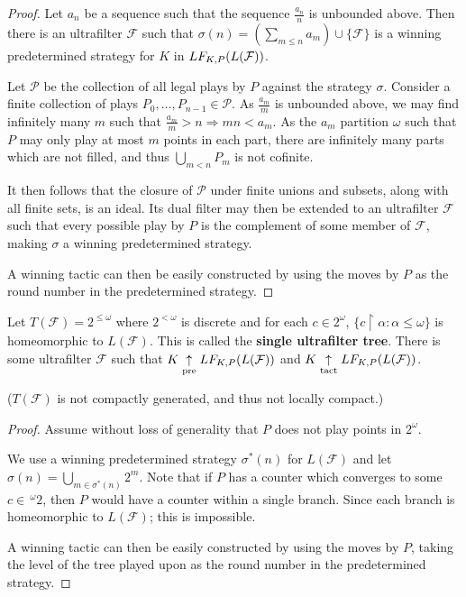 \begin{proof}
Let $a_n$ be a sequence such that the sequence $\frac{a_n}{n}$ is unbounded above. Then there is an ultrafilter $\mathcal{F}$ such that $\sigma(n)=(\sum_{m\leq n} a_m )\cup \{\mathcal{F}\}$ is a winning predetermined strategy for $K$ in $LF_{K,P}(L(\mathcal{F}))$.

Let $\mathcal{P}$ be the collection of all legal plays by $P$ against the strategy $\sigma$. Consider a finite collection of plays $P_0,\dots,P_{n-1}\in \mathcal{P}$. As $\frac{a_m}{m}$ is unbounded above, we may find infinitely many $m$ such that $\frac{a_m}{m}>n \Rightarrow mn<a_m$. As the $a_m$ partition $\omega$ such that $P$ may only play at most $m$ points in each part, there are infinitely many parts which are not filled, and thus $\bigcup_{m<n} P_m$ is not cofinite.

It then follows that the closure of $\mathcal{P}$ under finite unions and subsets, along with all finite sets, is an ideal. Its dual filter may then be extended to an ultrafilter $\mathcal{F}$ such that every possible play by $P$ is the complement of some member of $\mathcal{F}$, making $\sigma$ a winning predetermined strategy.

A winning tactic can then be easily constructed by using the moves by $P$ as the round number in the predetermined strategy.
\end{proof}

\begin{example}
Let $T(\mathcal{F}) = 2^{\leq\omega}$ where $2^{<\omega}$ is discrete and for each $c\in 2^\omega$, $\{c \restriction \alpha : \alpha \leq \omega\}$ is homeomorphic to $L(\mathcal{F})$. This is called the \textbf{single ultrafilter tree}. There is some ultrafilter $\mathcal{F}$ such that $K \underset{\text{pre}}{\uparrow} LF_{K,P}(L(\mathcal{F}))$ and $K \underset{\text{tact}}{\uparrow} LF_{K,P}(L(\mathcal{F}))$.

($T(\mathcal{F})$ is not compactly generated, and thus not locally compact.)
\end{example}

\begin{proof}
Assume without loss of generality that $P$ does not play points in $2^\omega$.

We use a winning predetermined strategy $\sigma^*(n)$ for $L(\mathcal{F})$ and let $\sigma(n) = \bigcup_{m \in \sigma^*(n)} 2^m$. Note that if $P$ has a counter which converges to some $c\in \,^\omega2$, then $P$ would have a counter within a single branch. Since each branch is homeomorphic to $L(\mathcal{F})$; this is impossible.

A winning tactic can then be easily constructed by using the moves by $P$, taking the level of the tree played upon as the round number in the predetermined strategy.
\end{proof}

